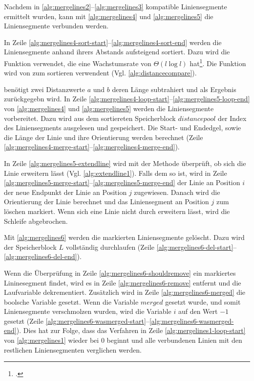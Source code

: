 Nachdem in \autoref{alg:mergelines2}--\autoref{alg:mergelines3} kompatible Liniensegmente ermittelt wurden, kann mit
 \autoref{alg:mergelines4} und \autoref{alg:mergelines5} die Liniensegmente verbunden werden.

In Zeile \ref{alg:mergelines4-sort-start}--\ref{alg:mergelines4-sort-end} werden die Liniensegmente anhand ihrers
 Abstands aufsteigend sortiert. Dazu wird die Funktion  verwendet, die eine Wachstumsrate von
 $\Theta(l \log l)$ hat\footcite{qsort}. Die Funktion  wird von  zum
 sortieren verwendent (Vgl. \autoref{alg:distancecompare}).

 benötigt zwei Distanzwerte $a$ und $b$ deren Länge subtrahiert und als Ergebnis zurückgegebn
 wird. In Zeile \ref{alg:mergelines4-loop-start}--\ref{alg:mergelines5-loop-end} von \autoref{alg:mergelines4} und
 \autoref{alg:mergelines5} werden die Liniensegmente vorbereitet. Dazu wird aus dem sortiereten Speicherblock
 $\mathit{distancepool}$ der Index des Liniensegments ausgelesen und gespeichert. Die Start- und Endedgel, sowie die
 Länge der Linie und ihre Orientierung werden berechnet
 (Zeile \ref{alg:mergelines4-merge-start}--\ref{alg:mergelines4-merge-end}).

In Zeile \ref{alg:mergelines5-extendline} wird mit der Methode  überprüft, ob sich die Linie
 erweitern lässt (Vgl. \autoref{alg:extendline1}). Falls dem so ist, wird in Zeile
 \ref{alg:mergelines5-merge-start}--\ref{alg:mergelines5-merge-end} der Linie an Position $i$ der neue Endpunkt der
 Linie an Position $j$ zugewiesen. Danach wird die Orientierung der Linie berechnet und das Liniensegment an Position
 $j$ zum löschen markiert. Wenn sich eine Linie nicht durch  erweitern lässt, wird die Schleife
 abgebrochen.

Mit \autoref{alg:mergelines6} werden die markierten Liniensegmente gelöscht. Dazu wird der Speicherblock $L$
 vollständig durchlaufen (Zeile \ref{alg:mergelines6-del-start}--\ref{alg:mergelines6-del-end}).

Wenn die Überprüfung in Zeile \ref{alg:mergelines6-shouldremove} ein markiertes Lininesegment findet, wird es in Zeile
 \ref{alg:mergelines6-remove} entfernt und die Laufvariable dekrementiert. Zusätzlich wird in Zeile
 \ref{alg:mergelines6-merged} die boolsche Variable gesetzt. Wenn die Variable $\mathit{merged}$ gesetzt wurde, und
 somit Liniensegmente verschmolzen wurden, wird die Variable $i$ auf den Wert $-1$ gesetzt
 (Zeile \ref{alg:mergelines6-wasmerged-start}--\ref{alg:mergelines6-wasmerged-end}). Dies hat zur Folge, dass das
 Verfahren  in Zeile \ref{alg:mergelines1-loop-start} von \autoref{alg:mergelines1} wieder bei $0$
 beginnt und alle verbundenen Linien mit den restlichen Liniensegmenten verglichen werden.

